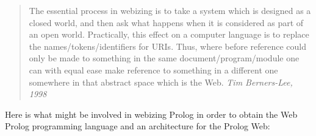 \documentclass{tlp}
\begin{document}
\begin{quotation}
\noindent The essential process in webizing is to take a system which is
designed as a closed world, and then ask what happens when it is
considered as part of an open world. Practically, this effect on a
computer language is to replace the names/tokens/identifiers for URIs.
Thus, where before reference could only be made to something in the
same document/program/module one can with equal ease make reference to
something in a different one somewhere in that abstract space which is
the Web.
\vspace{0cm}
\flushright  \textit{Tim Berners-Lee, 1998}
\vspace{0.2cm}
\end{quotation}

\noindent Here is what might be involved in webizing Prolog in order to obtain the Web Prolog programming language and an architecture for the Prolog Web:
\end{document}
